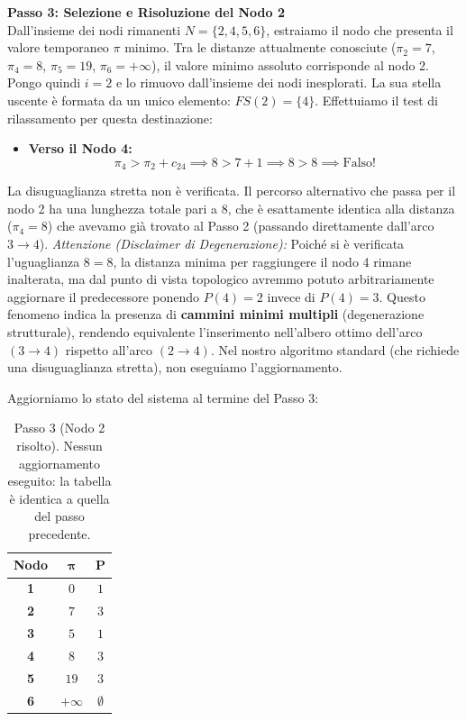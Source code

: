 \documentclass[12pt, a4paper]{article}
\begin{document}
	\textbf{Passo 3: Selezione e Risoluzione del Nodo 2}\\
	Dall'insieme dei nodi rimanenti $N = \{2, 4, 5, 6\}$, estraiamo il nodo che presenta il valore temporaneo $\pi$ minimo. Tra le distanze attualmente conosciute ($\pi_2 = 7$, $\pi_4 = 8$, $\pi_5 = 19$, $\pi_6 = +\infty$), il valore minimo assoluto corrisponde al nodo 2. 
	Pongo quindi $i = 2$ e lo rimuovo dall'insieme dei nodi inesplorati.
	La sua stella uscente è formata da un unico elemento: $FS(2) = \{4\}$.
	Effettuiamo il test di rilassamento per questa destinazione:
	\begin{itemize}
		\item \textbf{Verso il Nodo 4:}
		\[
		\pi_4 > \pi_2 + c_{24} \implies 8 > 7 + 1 \implies 8 > 8 \implies \text{Falso!}
		\]
	\end{itemize}
	La disuguaglianza stretta non è verificata. Il percorso alternativo che passa per il nodo 2 ha una lunghezza totale pari a 8, che è esattamente identica alla distanza ($\pi_4 = 8$) che avevamo già trovato al Passo 2 (passando direttamente dall'arco $3 \to 4$). 
	\textit{Attenzione (Disclaimer di Degenerazione):} Poiché si è verificata l'uguaglianza $8 = 8$, la distanza minima per raggiungere il nodo 4 rimane inalterata, ma dal punto di vista topologico avremmo potuto arbitrariamente aggiornare il predecessore ponendo $P(4) = 2$ invece di $P(4) = 3$. Questo fenomeno indica la presenza di \textbf{cammini minimi multipli} (degenerazione strutturale), rendendo equivalente l'inserimento nell'albero ottimo dell'arco $(3\to4)$ rispetto all'arco $(2\to4)$. Nel nostro algoritmo standard (che richiede una disuguaglianza stretta), non eseguiamo l'aggiornamento.
	
	Aggiorniamo lo stato del sistema al termine del Passo 3:
	\begin{table}[H]
		\centering
		\begin{tabular}{|c|c|c|}
			\hline
			\textbf{Nodo} & $\boldsymbol{\pi}$ & $\mathbf{P}$ \\
			\hline
			\rowcolor{titlecolor!20} \textbf{1} & $0$ & $1$ \\
			\rowcolor{titlecolor!20} \textbf{2} & $7$ & $3$ \\
			\rowcolor{titlecolor!20} \textbf{3} & $5$ & $1$ \\
			\textbf{4} & $8$ & $3$ \\
			\textbf{5} & $19$ & $3$ \\
			\textbf{6} & $+\infty$ & $\emptyset$ \\
			\hline
		\end{tabular}
		\caption*{Passo 3 (Nodo 2 risolto). Nessun aggiornamento eseguito: la tabella è identica a quella del passo precedente.}
	\end{table}
	
\end{document}
